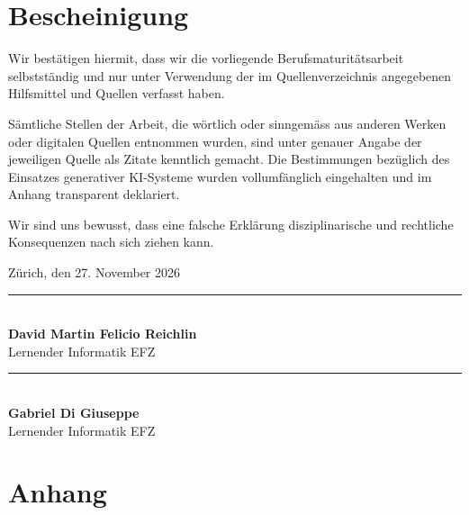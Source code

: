 \documentclass[12pt,a4paper]{scrartcl}
\begin{document}
\section{Bescheinigung}
\label{sec:bescheinigung}

\vspace{0.5cm}

\noindent
Wir bestätigen hiermit, dass wir die vorliegende Berufsmaturitätsarbeit selbstständig und nur unter Verwendung der im Quellenverzeichnis angegebenen Hilfsmittel und Quellen verfasst haben.

\vspace{0.4cm}
\noindent
Sämtliche Stellen der Arbeit, die wörtlich oder sinngemäss aus anderen Werken oder digitalen Quellen entnommen wurden, sind unter genauer Angabe der jeweiligen Quelle als Zitate kenntlich gemacht. Die Bestimmungen bezüglich des Einsatzes generativer KI-Systeme wurden vollumfänglich eingehalten und im Anhang transparent deklariert.

\vspace{0.4cm}
\noindent
Wir sind uns bewusst, dass eine falsche Erklärung disziplinarische und rechtliche Konsequenzen nach sich ziehen kann.

\vspace{2.2cm}

\noindent
Zürich, den 27. November 2026

\vspace{2.5cm}

\noindent
\begin{minipage}[t]{0.45\textwidth}
    \rule{\linewidth}{0.8pt}\\[0.4em]
    \textbf{David Martin Felicio Reichlin}\\
    {\small Lernender Informatik EFZ}
\end{minipage}
\hfill
\begin{minipage}[t]{0.45\textwidth}
    \rule{\linewidth}{0.8pt}\\[0.4em]
    \textbf{Gabriel Di Giuseppe}\\
    {\small Lernender Informatik EFZ}
\end{minipage}

\newpage

\appendix
\section{Anhang}
\label{sec:anhang}
\end{document}

